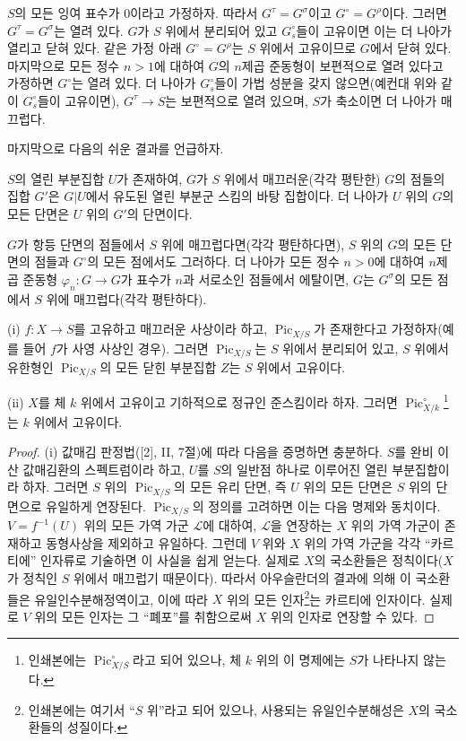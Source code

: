  $S$의 모든 잉여 표수가 0이라고 가정하자. 따라서
$G^\tau=G^\sigma$이고 $G^\circ=G^\rho$이다. 그러면
$G^\tau=G^\sigma$는 열려 있다. $G$가 $S$ 위에서 분리되어 있고
$G_s^\circ$들이 고유이면 이는 더 나아가 열리고 닫혀 있다. 같은 가정 아래
$G^\circ=G^\rho$는 $S$ 위에서 고유이므로 $G$에서 닫혀 있다. 마지막으로
모든 정수 $n>1$에 대하여 $G$의 $n$제곱 준동형이 보편적으로 열려 있다고
가정하면 $G^\circ$는 열려 있다. 더 나아가 $G_s^\circ$들이 가법 성분을
갖지 않으면(예컨대 위와 같이 $G_s^\circ$들이 고유이면),
$G^\tau\longrightarrow S$는 보편적으로 열려 있으며, $S$가 축소이면 더
나아가 매끄럽다.

마지막으로 다음의 쉬운 결과를 언급하자.

 $S$의 열린 부분집합 $U$가 존재하여, $G$가 $S$ 위에서
매끄러운(각각 평탄한) $G$의 점들의 집합 $G'$은 $G|U$에서 유도된 열린
부분군 스킴의 바탕 집합이다. 더 나아가 $U$ 위의 $G$의 모든 단면은 $U$
위의 $G'$의 단면이다.

 $G$가 항등 단면의 점들에서 $S$ 위에
매끄럽다면(각각 평탄하다면), $S$ 위의 $G$의 모든 단면의 점들과
$G^\circ$의 모든 점에서도 그러하다. 더 나아가 모든 정수 $n>0$에 대하여
$n$제곱 준동형 $\varphi_n:G\longrightarrow G$가 표수가 $n$과 서로소인
점들에서 에탈이면, $G$는 $G^\sigma$의 모든 점에서 $S$ 위에
매끄럽다(각각 평탄하다).



\noindent(i) $f:X\longrightarrow S$를 고유하고 매끄러운 사상이라 하고,
$\operatorname{Pic}_{X/S}$가 존재한다고 가정하자(예를 들어 $f$가 사영
사상인 경우). 그러면 $\operatorname{Pic}_{X/S}$는 $S$ 위에서 분리되어
있고, $S$ 위에서 유한형인 $\operatorname{Pic}_{X/S}$의 모든 닫힌 부분집합
$Z$는 $S$ 위에서 고유이다.

\noindent(ii) $X$를 체 $k$ 위에서 고유이고 기하적으로 정규인 준스킴이라
하자. 그러면 $\operatorname{Pic}_{X/k}^\circ$\footnote{인쇄본에는
$\operatorname{Pic}_{X/S}^\circ$라고 되어 있으나, 체 $k$ 위의 이 명제에는
$S$가 나타나지 않는다.}는 $k$ 위에서 고유이다.

\begin{proof}
(i) 값매김 판정법([2], II, 7절)에 따라 다음을 증명하면 충분하다. $S$를
완비 이산 값매김환의 스펙트럼이라 하고, $U$를 $S$의 일반점 하나로 이루어진
열린 부분집합이라 하자. 그러면 $S$ 위의 $\operatorname{Pic}_{X/S}$의 모든
유리 단면, 즉 $U$ 위의 모든 단면은 $S$ 위의 단면으로 유일하게 연장된다.
$\operatorname{Pic}_{X/S}$의 정의를 고려하면 이는 다음 명제와 동치이다.
$V=f^{-1}(U)$ 위의 모든 가역 가군 $\mathcal L$에 대하여, $\mathcal L$을
연장하는 $X$ 위의 가역 가군이 존재하고 동형사상을 제외하고 유일하다. 그런데
$V$ 위와 $X$ 위의 가역 가군을 각각 ``카르티에'' 인자류로 기술하면 이 사실을
쉽게 얻는다. 실제로 $X$의 국소환들은 정칙이다($X$가 정칙인 $S$ 위에서
매끄럽기 때문이다). 따라서 아우슬란더의 결과에 의해 이 국소환들은
유일인수분해정역이고, 이에 따라 $X$ 위의 모든 인자\footnote{인쇄본에는
여기서 ``$S$ 위''라고 되어 있으나, 사용되는 유일인수분해성은 $X$의
국소환들의 성질이다.}는 카르티에 인자이다. 실제로 $V$ 위의 모든 인자는 그
``폐포''를 취함으로써 $X$ 위의 인자로 연장할 수 있다.
\end{proof}

